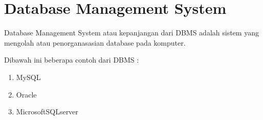 \documentclass{article}
\begin{document}
\section{Database Management System}
Database Management System atau kepanjangan dari DBMS adalah sistem yang mengolah atau penorganasasian database pada komputer.



Dibawah ini beberapa contoh dari DBMS :
\begin{enumerate}
    \item 
     MySQL
     \item
     Oracle
     \item
     MicrosoftSQLserver
    

\end{enumerate}

    




 
\end{document}
